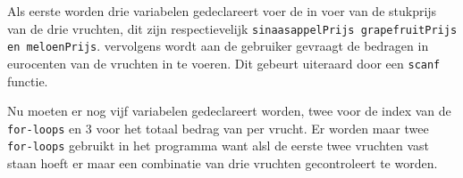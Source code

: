 Als eerste worden drie variabelen gedeclareert voer de in voer van de stukprijs van de drie vruchten, dit zijn respectievelijk {\tt sinaasappelPrijs grapefruitPrijs en meloenPrijs}.
vervolgens wordt aan de gebruiker gevraagt de bedragen in eurocenten van de vruchten  in te voeren.
Dit gebeurt uiteraard door een {\tt scanf} functie.

Nu moeten er nog vijf variabelen gedeclareert worden, twee voor de index van de {\tt for-loops} en 3 voor het totaal bedrag van per vrucht.
Er worden maar twee {\tt for-loops} gebruikt in het programma want alsl de eerste twee vruchten vast staan hoeft er maar een combinatie van drie vruchten gecontroleert te worden.
  
